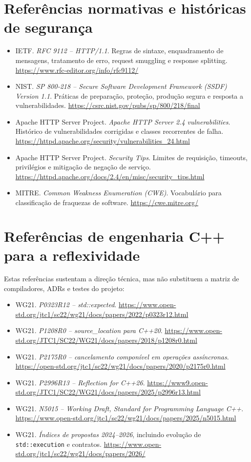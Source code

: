 \documentclass[11pt,a4paper,oneside]{article}
\begin{document}
\section{Referências normativas e históricas de segurança}
\label{sec:referencias-seguranca}
\begin{itemize}
  \item IETF. \textit{RFC 9112 -- HTTP/1.1}. Regras de sintaxe, enquadramento de mensagens, tratamento de erro, request smuggling e response splitting. \url{https://www.rfc-editor.org/info/rfc9112/}
  \item NIST. \textit{SP 800-218 -- Secure Software Development Framework (SSDF) Version 1.1}. Práticas de preparação, proteção, produção segura e resposta a vulnerabilidades. \url{https://csrc.nist.gov/pubs/sp/800/218/final}
  \item Apache HTTP Server Project. \textit{Apache HTTP Server 2.4 vulnerabilities}. Histórico de vulnerabilidades corrigidas e classes recorrentes de falha. \url{https://httpd.apache.org/security/vulnerabilities_24.html}
  \item Apache HTTP Server Project. \textit{Security Tips}. Limites de requisição, timeouts, privilégios e mitigação de negação de serviço. \url{https://httpd.apache.org/docs/2.4/en/misc/security_tips.html}
  \item MITRE. \textit{Common Weakness Enumeration (CWE)}. Vocabulário para classificação de fraquezas de software. \url{https://cwe.mitre.org/}
\end{itemize}


\section{Referências de engenharia C++ para a reflexividade}
\label{sec:referencias-cpp}
Estas referências sustentam a direção técnica, mas não substituem a matriz de compiladores, ADRs e testes do projeto:
\begin{itemize}
  \item WG21. \textit{P0323R12 -- std::expected}. \url{https://www.open-std.org/jtc1/sc22/wg21/docs/papers/2022/p0323r12.html}
  \item WG21. \textit{P1208R0 -- source\_location para C++20}. \url{https://www.open-std.org/JTC1/SC22/WG21/docs/papers/2018/p1208r0.html}
  \item WG21. \textit{P2175R0 -- cancelamento componível em operações assíncronas}. \url{https://open-std.org/jtc1/sc22/wg21/docs/papers/2020/p2175r0.html}
  \item WG21. \textit{P2996R13 -- Reflection for C++26}. \url{https://www9.open-std.org/JTC1/SC22/WG21/docs/papers/2025/p2996r13.html}
  \item WG21. \textit{N5015 -- Working Draft, Standard for Programming Language C++}. \url{https://www.open-std.org/jtc1/sc22/wg21/docs/papers/2025/n5015.html}
  \item WG21. \textit{Índices de propostas 2024--2026}, incluindo evolução de \texttt{std::execution} e contratos. \url{https://www.open-std.org/jtc1/sc22/wg21/docs/papers/2026/}
\end{itemize}
\end{document}
